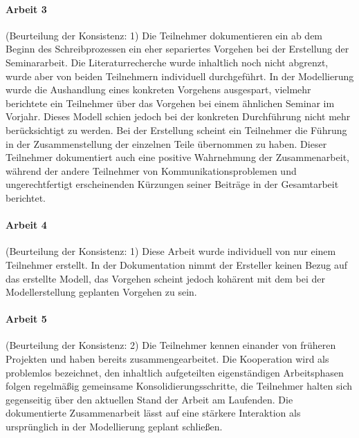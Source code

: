 
\paragraph{Arbeit 3} %
\label{par:arbeit_3}

(Beurteilung der Konsistenz: 1) Die Teilnehmer dokumentieren ein ab dem Beginn des Schreibprozessen ein eher separiertes Vorgehen bei der Erstellung der Seminararbeit. Die Literaturrecherche wurde inhaltlich noch nicht abgrenzt, wurde aber von beiden Teilnehmern individuell durchgeführt. In der Modellierung wurde die Aushandlung eines konkreten Vorgehens ausgespart, vielmehr berichtete ein Teilnehmer über das Vorgehen bei einem ähnlichen Seminar im Vorjahr. Dieses Modell schien jedoch bei der konkreten Durchführung nicht mehr berücksichtigt zu werden. Bei der Erstellung scheint ein Teilnehmer die Führung in der Zusammenstellung der einzelnen Teile übernommen zu haben. Dieser Teilnehmer dokumentiert auch eine positive Wahrnehmung der Zusammenarbeit, während der andere Teilnehmer von Kommunikationsproblemen und ungerechtfertigt erscheinenden Kürzungen seiner Beiträge in der Gesamtarbeit berichtet. 

\paragraph{Arbeit 4} %
\label{par:arbeit_4}

(Beurteilung der Konsistenz: 1) Diese Arbeit wurde individuell von nur einem Teilnehmer erstellt. In der Dokumentation nimmt der Ersteller keinen Bezug auf das erstellte Modell, das Vorgehen scheint jedoch kohärent mit dem bei der Modellerstellung geplanten Vorgehen zu sein.

\paragraph{Arbeit 5} %
\label{par:arbeit_5}

(Beurteilung der Konsistenz: 2) Die Teilnehmer kennen einander von früheren Projekten und haben bereits zusammengearbeitet. Die Kooperation wird als problemlos bezeichnet, den inhaltlich aufgeteilten eigenständigen Arbeitsphasen folgen regelmäßig gemeinsame Konsolidierungsschritte, die Teilnehmer halten sich gegenseitig über den aktuellen Stand der Arbeit am Laufenden. Die dokumentierte Zusammenarbeit lässt auf eine stärkere Interaktion als ursprünglich in der Modellierung geplant schließen.

